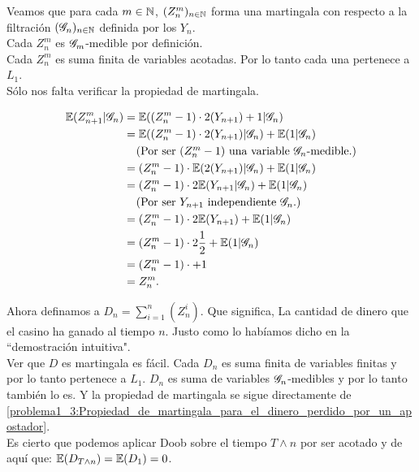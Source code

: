 	Veamos que para cada $m \in \mathbb{N}$, $(Z_n^m)_{n \in \mathbb{N}}$ forma una martingala con respecto a la filtración $(\mathscr{G}_n)_{n \in \mathbb{N}}$ 
	definida por los $Y_n$.\\
	
	Cada $Z_n^m$ es $\mathscr{G}_m$-medible por definición.\\
	
	Cada $Z_n^m$ es suma finita de variables acotadas. Por lo tanto cada una pertenece a $L_1$.\\
	
	Sólo nos falta verificar la propiedad de martingala.
	
	\begin{align}\label{problema1_3:Propiedad_de_martingala_para_el_dinero_perdido_por_un_apostador}
		\mathbb{E}(Z_{n+1}^{m} | \mathscr{G}_n) &= \mathbb{E}((Z_n^{m} - 1) \cdot 2(Y_{n+1}) + 1 | \mathscr{G}_n)\\
							   &= \mathbb{E}((Z_n^{m} -1) \cdot 2(Y_{n+1}) | \mathscr{G}_n) + \mathbb{E}( 1 | \mathscr{G}_n)\\
							   &\;\;\;\;\mbox{(Por ser $(Z_n^{m} - 1)$ una variable $\mathscr{G}_n$-medible.)}\\
							   &= (Z_n^{m} -1) \cdot \mathbb{E}(  2(Y_{n+1}) | \mathscr{G}_n) + \mathbb{E}( 1 | \mathscr{G}_n)\\
							   &= (Z_n^{m} -1) \cdot 2\mathbb{E}( Y_{n+1} | \mathscr{G}_n) + \mathbb{E}( 1 | \mathscr{G}_n)\\
							   &\;\;\;\;\mbox{(Por ser $Y_{n + 1}$ independiente $\mathscr{G}_n$.)}\\
							   &= (Z_n^{m} -1) \cdot 2\mathbb{E}( Y_{n+1}) + \mathbb{E}( 1 | \mathscr{G}_n)\\
							   &= (Z_n^{m} -1) \cdot 2 \frac{1}{2} + \mathbb{E}( 1 | \mathscr{G}_n)\\
							   &= (Z_n^{m} -1) \cdot + 1 \\
							   &= Z_n^m.
	\end{align}
	
	Ahora definamos a $D_n = \sum_{i=1}^n (Z_n^i)$. Que significa, La cantidad de dinero que el casino ha ganado al tiempo $n$. 
	Justo como lo habíamos dicho en la ``demostración intuitiva".\\
	
	Ver que $D$ es martingala es fácil. Cada $D_n$ es suma finita de variables finitas y por lo tanto pertenece a $L_1$.
	$D_n$ es suma de variables $\mathscr{G}_n$-medibles y por lo tanto también lo es. Y la propiedad de martingala se sigue directamente de
	\eqref{problema1_3:Propiedad_de_martingala_para_el_dinero_perdido_por_un_apostador}.\\
	
	Es cierto que podemos aplicar Doob sobre el tiempo $T \wedge n$ por ser acotado y de aquí que:
	$\mathbb{E}(D_{T \wedge n}) = \mathbb{E}(D_1) = 0$.\\
	
